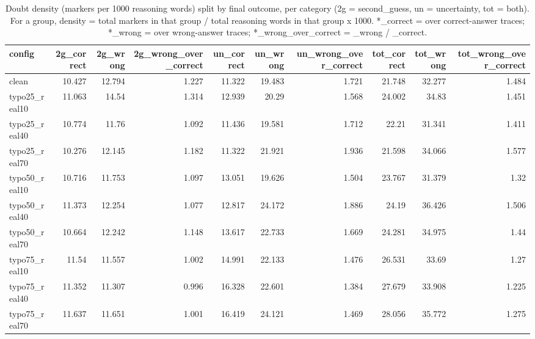 \documentclass[11pt]{article}
\begin{document}
\begin{table}[H]
\centering
\caption{Doubt density (markers per 1000 reasoning words) split by final outcome, per category (2g = second\_guess, un = uncertainty, tot = both). For a group, density = total markers in that group / total reasoning words in that group x 1000. *\_correct = over correct-answer traces; *\_wrong = over wrong-answer traces; *\_wrong\_over\_correct = \_wrong / \_correct.}
\small
\begin{adjustbox}{max width=\textwidth}
\begin{tabular}{lrrrrrrrrr}
\toprule
\textbf{config} & \textbf{2g\_correct} & \textbf{2g\_wrong} & \textbf{2g\_wrong\_over\_correct} & \textbf{un\_correct} & \textbf{un\_wrong} & \textbf{un\_wrong\_over\_correct} & \textbf{tot\_correct} & \textbf{tot\_wrong} & \textbf{tot\_wrong\_over\_correct} \\
\midrule
clean & 10.427 & 12.794 & 1.227 & 11.322 & 19.483 & 1.721 & 21.748 & 32.277 & 1.484 \\
typo25\_real10 & 11.063 & 14.54 & 1.314 & 12.939 & 20.29 & 1.568 & 24.002 & 34.83 & 1.451 \\
typo25\_real40 & 10.774 & 11.76 & 1.092 & 11.436 & 19.581 & 1.712 & 22.21 & 31.341 & 1.411 \\
typo25\_real70 & 10.276 & 12.145 & 1.182 & 11.322 & 21.921 & 1.936 & 21.598 & 34.066 & 1.577 \\
typo50\_real10 & 10.716 & 11.753 & 1.097 & 13.051 & 19.626 & 1.504 & 23.767 & 31.379 & 1.32 \\
typo50\_real40 & 11.373 & 12.254 & 1.077 & 12.817 & 24.172 & 1.886 & 24.19 & 36.426 & 1.506 \\
typo50\_real70 & 10.664 & 12.242 & 1.148 & 13.617 & 22.733 & 1.669 & 24.281 & 34.975 & 1.44 \\
typo75\_real10 & 11.54 & 11.557 & 1.002 & 14.991 & 22.133 & 1.476 & 26.531 & 33.69 & 1.27 \\
typo75\_real40 & 11.352 & 11.307 & 0.996 & 16.328 & 22.601 & 1.384 & 27.679 & 33.908 & 1.225 \\
typo75\_real70 & 11.637 & 11.651 & 1.001 & 16.419 & 24.121 & 1.469 & 28.056 & 35.772 & 1.275 \\
\bottomrule
\end{tabular}
\end{adjustbox}
\end{table}
\end{document}
